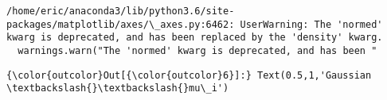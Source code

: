\documentclass[11pt]{article}
\begin{document}
    \begin{Verbatim}[commandchars=\\\{\}]
/home/eric/anaconda3/lib/python3.6/site-packages/matplotlib/axes/\_axes.py:6462: UserWarning: The 'normed' kwarg is deprecated, and has been replaced by the 'density' kwarg.
  warnings.warn("The 'normed' kwarg is deprecated, and has been "

    \end{Verbatim}

\begin{Verbatim}[commandchars=\\\{\}]
{\color{outcolor}Out[{\color{outcolor}6}]:} Text(0.5,1,'Gaussian \textbackslash{}\textbackslash{}mu\_i')
\end{Verbatim}
            
    \begin{center}
    \end{center}
    { \hspace*{\fill} \\}
    

    
    
    
    
\end{document}
